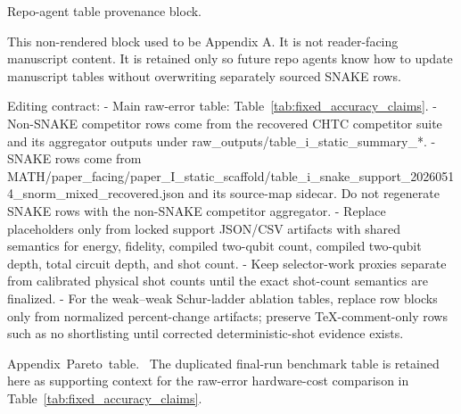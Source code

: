 \documentclass[
  reprint,
  amsmath,
  amssymb,
  aps,
  pra,
  nofootinbib,
  superscriptaddress,
  floatfix
]{revtex4-2}
\newcommand{\tentative}[1]{\textcolor{red!70!black}{#1}}
\newcommand{\structlabel}[1]{\noindent\mbox{\tentative{#1.}}~}
\begin{document}
\clearpage
\appendix

\iffalse
Repo-agent table provenance block.

This non-rendered block used to be Appendix A. It is not reader-facing
manuscript content. It is retained only so future repo agents know how to
update manuscript tables without overwriting separately sourced SNAKE rows.

Editing contract:
- Main raw-error table: Table~\ref{tab:fixed_accuracy_claims}.
- Non-SNAKE competitor rows come from the recovered CHTC competitor suite and
  its aggregator outputs under raw_outputs/table_i_static_summary_*.
- SNAKE rows come from
  MATH/paper_facing/paper_I_static_scaffold/table_i_snake_support_20260514_snorm_mixed_recovered.json
  and its source-map sidecar. Do not regenerate SNAKE rows with the non-SNAKE
  competitor aggregator.
- Replace placeholders only from locked support JSON/CSV artifacts with shared
  semantics for energy, fidelity, compiled two-qubit count, compiled two-qubit
  depth, total circuit depth, and shot count.
- Keep selector-work proxies separate from calibrated physical shot counts
  until the exact shot-count semantics are finalized.
- For the weak--weak Schur-ladder ablation tables, replace row blocks only
  from normalized percent-change artifacts; preserve TeX-comment-only rows
  such as no shortlisting until corrected deterministic-shot evidence exists.

\structlabel{Appendix Pareto table}
The duplicated final-run benchmark table is retained here as supporting context for the raw-error hardware-cost comparison in Table~\ref{tab:fixed_accuracy_claims}.
\end{document}
